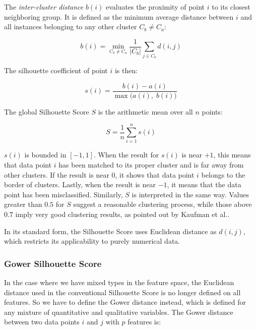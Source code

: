 \vspace {1em}

The \emph{inter-cluster distance} $b(i)$ evaluates the proximity of point $i$ to its closest neighboring group. It is defined as the minimum average distance between $i$ and all instances belonging to any other cluster $C_b \neq C_a$:

\begin{equation}
    b(i) = \min_{C_b \neq C_a} \frac{1}{|C_b|} \sum_{j \in C_b} d(i, j)
    \label{eq:silhouette_b}
\end{equation}

The silhouette coefficient of point $i$ is then:

\begin{equation}
    s(i) = \frac{b(i) - a(i)}{\max\bigl(a(i),\; b(i)\bigr)}
    \label{eq:silhouette_si}
\end{equation}

The global Silhouette Score $S$ is the arithmetic mean over all $n$ points:

\begin{equation}
    S = \frac{1}{n} \sum_{i=1}^{n} s(i)
    \label{eq:silhouette_global}
\end{equation}

$s(i)$ is bounded in $[-1, 1]$. When the result for $s(i)$ is near $+1$, this means that data point $i$ has been matched to its proper cluster and is far away from other clusters. If the result is near $0$, it shows that data point $i$ belongs to the border of clusters. Lastly, when the result is near $-1$, it means that the data point has been misclassified. Similarly, $S$ is interpreted in the same way. Values greater than $0.5$ for $S$ suggest a reasonable clustering process, while those above $0.7$ imply very good clustering results, as pointed out by Kaufman et al.\cite{kaufman1990}.

In its standard form, the Silhouette Score uses Euclidean distance as $d(i,j)$, which restricts its applicability to purely numerical data.

\subsubsection*{Gower Silhouette Score}

In the case where we have mixed types in the feature space, the Euclidean distance used in the conventional Silhouette Score is no longer defined on all features. So we have to define the Gower distance \cite{gower1971} instead, which is defined for any mixture of quantitative and qualitative variables. The Gower distance between two data points $i$ and $j$ with $p$ features is:

